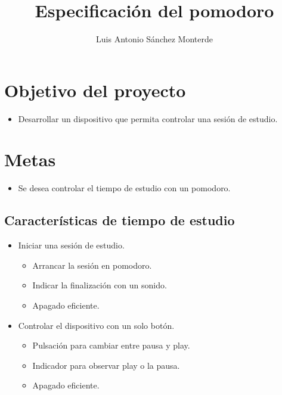 \documentclass{article}
\title{Especificación del pomodoro}
\author{Luis Antonio Sánchez Monterde}
\begin{document}
\maketitle
\section{Objetivo del proyecto}
\begin{itemize}
	\item Desarrollar un dispositivo que permita controlar una sesión de
		estudio.
\end{itemize}
\section{Metas}
\begin{itemize}
	\item Se desea controlar el tiempo de estudio con un pomodoro.
\end{itemize}

\subsection{Características de tiempo de estudio}
\begin{itemize}
	\item Iniciar una sesión de estudio.
	\begin{itemize}
		\item Arrancar la sesión en pomodoro.
		\item Indicar la finalización con un sonido.
		\item Apagado eficiente.
	\end{itemize}

	\item Controlar el dispositivo con un solo botón.
	\begin{itemize}
		\item Pulsación para cambiar entre pausa y play.
		\item Indicador para observar play o la pausa.
		\item Apagado eficiente.
	\end{itemize}
\end{itemize}
\end{document}
